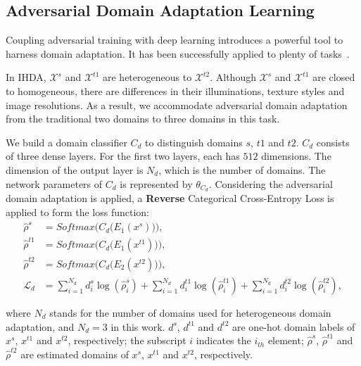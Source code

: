 \documentclass[journal]{IEEEtran}
\begin{document}
\subsection{Adversarial Domain Adaptation Learning}

Coupling adversarial training with deep learning introduces a powerful tool to harness domain adaptation. It has been successfully applied to plenty of tasks~\cite{ganin2015unsupervised,wang2018deep,dai2018cross,cao2018partial,zou2019consensus}. 

In IHDA, $\mathcal{X}^{s}$ and $\mathcal{X}^{t1}$ are heterogeneous to $\mathcal{X}^{t2}$. Although $\mathcal{X}^{s}$ and $\mathcal{X}^{t1}$ are closed to homogeneous, there are differences in their illuminations, texture styles and image resolutions. As a result, we accommodate adversarial domain adaptation from the traditional two domains to three domains in this task. 

We build a domain classifier $C_{d}$ to distinguish domains $s$, $t1$ and $t2$. $C_{d}$ consists of three dense layers. For the first two layers, each has $512$ dimensions. The dimension of the output layer is $N_{d}$, which is the number of domains. The network parameters of $C_{d}$ is represented by $\theta_{C_{d}}$. Considering the adversarial domain adaptation is applied, a \textbf{Reverse} Categorical Cross-Entropy Loss is applied to form the loss function:
\begin{equation}
\begin{split}
\hat{\rho}^{s} &=  Softmax \bigg(  C_{d} \big(E_{1}(x^{s}) \big) \bigg), \\
\hat{\rho}^{t1} &=  Softmax \bigg(  C_{d} \big(E_{1}(x^{t1}) \big) \bigg), \\
\hat{\rho}^{t2} &=  Softmax \bigg(  C_{d} \big(E_{2}(x^{t2}) \big) \bigg), \\
\mathcal{L}_{d} &=  \sum_{i=1}^{N_{d}} d^{s}_{i} \log (\hat{\rho}^{s}_{i}) + \sum_{i=1}^{N_{d}} d^{t1}_{i} \log (\hat{\rho}^{t1}_{i}) + \sum_{i=1}^{N_{d}} d^{t2}_{i} \log (\hat{\rho}^{t2}_{i}),\\\\
\end{split}
\end{equation}
where $N_{d}$ stands for the number of domains used for heterogeneous domain adaptation, and $N_{d}=3$ in this work. $d^{s}$, $d^{t1}$ and $d^{t2}$ are one-hot domain labels of $x^s$, $x^{t1}$ and $x^{t2}$, respectively; the subscript $i$ indicates the $i_{th}$ element; $\hat{\rho}^{s}$, $\hat{\rho}^{t1}$ and $\hat{\rho}^{t2}$ are estimated domains of $x^s$, $x^{t1}$ and $x^{t2}$, respectively. 
\end{document}
